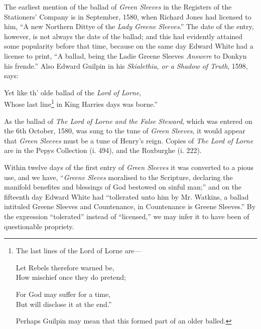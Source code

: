 The earliest mention of the ballad of \textit{Green Sleeves} in the Registers of the
Stationers’ Company is in September, 1580, when Richard Jones had licensed to
him, “A new Northern Dittye of the \textit{Lady Greene Sleeves}.” The date of the
entry, however, is not always the date of the ballad; and this had evidently
attained some popularity before that time, \pagebreak because on the same day Edward
White had a license to print, “A ballad, being the Ladie Greene Sleeves \textit{Answere}
to Donkyn his frende.” Also Edward Guilpin in his \textit{Skialethia, or a Shadow of
Truth}, 1598, says:
\begin{scverse}
Yet like th’ olde ballad of the \textit{Lord of Lorne},\\
Whose last line\footnote{\textit{}
The last lines of the Lord of Lorne are—
\settowidth{\versewidth}{Let Rebels therefore warned be,}
\begin{fnverse}
\begin{altverse}
Let Rebels therefore warned be,\\
How mischief once they do pretend;

For God may suffer for a time,\\
But will disclose it at the end.”
\end{altverse}
\end{fnverse}

Perhaps Guilpin may mean that this formed part of an
older balled.}
 in King Harries days was borne.”
\end{scverse}

As the ballad of \textit{The Lord of Lorne and the False Steward}, which was entered on
the 6th October, 1580, was sung to the tune of \textit{Green Sleeves}, it would appear that
\textit{Green Sleeves} must be a tune of Henry’s reign. Copies of \textit{The Lord of Lorne} are in
the Pepys Collection (i. 494), and the Roxburghe (i. 222).

Within twelve days of the first entry of \textit{Green Sleeves} it was converted to a
pious use, and we have, “\textit{Greene Sleves} moralised to the Scripture, declaring the
manifold benefites and blessings of God bestowed on sinful man;” and on the
fifteenth day Edward White had “tollerated unto him by Mr. Watkins, a
ballad intituled Greene Sleeves and Countenance, in Countenance is Greene
Sleeves.” By the expression “tolerated” instead of “licensed,” we may infer
it to have been of questionable propriety.

